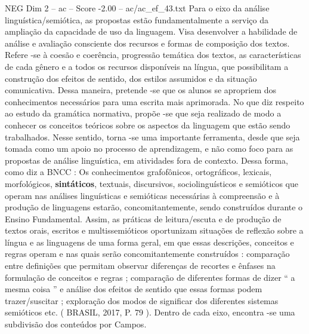 \begin{textsample}{NEG Dim 2 – ac – Score -2.00 – ac/ac\_ef\_43.txt}
Para o eixo da análise linguística/semiótica, as propostas estão fundamentalmente a serviço da ampliação da capacidade de uso da linguagem.
Visa desenvolver a habilidade de análise e avaliação consciente dos recursos e formas de composição dos textos.
Refere -se à coesão e coerência, progressão temática dos textos, as características de cada gênero e a todos os recursos disponíveis na língua, que possibilitam a construção dos efeitos de sentido, dos estilos assumidos e da situação comunicativa.
Dessa maneira, pretende -se que os alunos se apropriem dos conhecimentos necessários para uma escrita mais aprimorada.
No que diz respeito ao estudo da gramática normativa, propõe -se que seja realizado de modo a conhecer os conceitos teóricos sobre os aspectos da linguagem que estão sendo trabalhados.
Nesse sentido, torna -se uma importante ferramenta, desde que seja tomada como um apoio no processo de aprendizagem, e não como foco para as propostas de análise linguística, em atividades fora de contexto.
Dessa forma, como diz a BNCC : Os conhecimentos grafofônicos, ortográficos, lexicais, morfológicos, \textbf{sintáticos}, textuais, discursivos, sociolinguísticos e semióticos que operam nas análises linguísticas e semióticas necessárias à compreensão e à produção de linguagens estarão, concomitantemente, sendo construídos durante o Ensino Fundamental.
Assim, as práticas de leitura/escuta e de produção de textos orais, escritos e multissemióticos oportunizam situações de reflexão sobre a língua e as linguagens de uma forma geral, em que essas descrições, conceitos e regras operam e nas quais serão concomitantemente construídos : comparação entre definições que permitam observar diferenças de recortes e ênfases na formulação de conceitos e regras ; comparação de diferentes formas de dizer “ a mesma coisa ” e análise dos efeitos de sentido que essas formas podem trazer/suscitar ; exploração dos modos de significar dos diferentes sistemas semióticos etc. ( BRASIL, 2017, P. 79 ).
Dentro de cada eixo, encontra -se uma subdivisão dos conteúdos por Campos.

\end{textsample}
